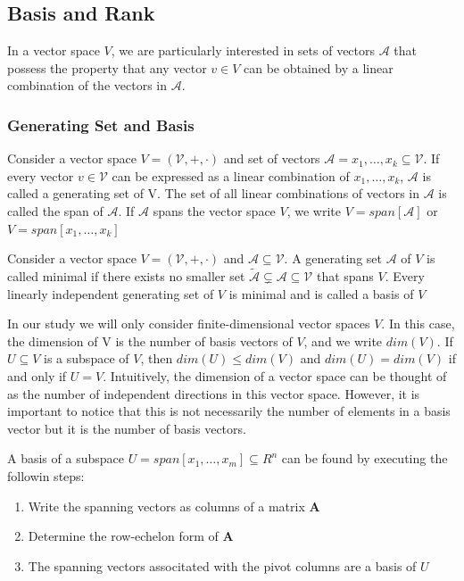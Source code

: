 \subsection{Basis and Rank}
In a vector space $V$, we are particularly interested in sets of vectors $\mathcal{A}$ that possess the property that any vector $v \in V$ can be obtained by a linear combination of the vectors in $\mathcal{A}$.
\subsubsection{Generating Set and Basis}
\begin{definition}
    Consider a vector space $V = (\mathcal{V},+,\cdot)$ and set of vectors $\mathcal{A} = {x_1,\ldots,x_k} \subseteq \mathcal{V}$. If every vector $v \in \mathcal{V}$ can be expressed as a linear combination of $x_1, \ldots, x_k$, $\mathcal{A}$ is called a generating set of V. The set of all linear combinations of vectors in $\mathcal{A}$ is called the span of $\mathcal{A}$. If $\mathcal{A}$ spans the vector space $V$, we write $V = span[\mathcal{A}]$ or $V = span[x_1,\ldots,x_k]$
\end{definition}
\begin{definition}[Basis]
    Consider a vector space $V = (\mathcal{V},+,\cdot)$ and $\mathcal{A} \subseteq \mathcal{V}$. A generating set $\mathcal{A}$ of $V$ is called minimal if there exists no smaller set $\tilde{\mathcal{A}}\subsetneq \mathcal{A} \subseteq \mathcal{V}$ that spans $V$. Every linearly independent generating set of $V$ is minimal and is called a basis of $V$
\end{definition}
In our study we will only consider finite-dimensional vector spaces $V$. In this case, the dimension of V is the number of basis vectors of $V$, and we write $dim(V)$. If $U\subseteq V$ is a subspace of $V$, then $dim(U) \leq dim(V)$ and $dim(U) = dim(V)$ if and only if $U=V$. Intuitively, the dimension of a vector space can be thought of as the number of independent directions in this vector space. However, it is important to notice that this is not necessarily the number of elements in a basis vector but it is the number of basis vectors.
\begin{remark}
    A basis of a subspace $U = span[x_1,\ldots,x_m] \subseteq R^n$ can be found by executing the followin steps:
    \begin{enumerate}
        \item Write the spanning vectors as columns of a matrix $\mathbf{A}$
        \item Determine the row-echelon form of $\mathbf{A}$
        \item The spanning vectors associtated with the pivot columns are a basis of $U$
    \end{enumerate}
\end{remark}


